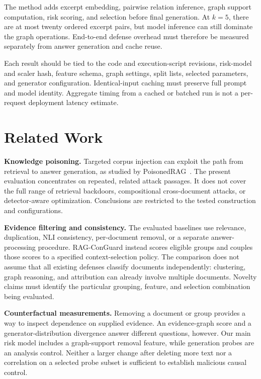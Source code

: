 \documentclass[sigconf]{acmart}
\newif\ifrevisionnotes
\newcommand{\verification}[1]{%
  \ifrevisionnotes
    \par\smallskip\noindent
    {\small\color{red!65!black}\textbf{Verification pending.} #1}\par\smallskip
  \fi}
\begin{document}
The method adds excerpt embedding, pairwise relation inference, graph support computation, risk scoring, and selection before final generation. At $k=5$, there are at most twenty ordered excerpt pairs, but model inference can still dominate the graph operations. End-to-end defense overhead must therefore be measured separately from answer generation and cache reuse.

Each result should be tied to the code and execution-script revisions, risk-model and scaler hash, feature schema, graph settings, split lists, selected parameters, and generator configuration. Identical-input caching must preserve full prompt and model identity. Aggregate timing from a cached or batched run is not a per-request deployment latency estimate.

\verification{The reported 0.67 seconds per generation is a batch-derived hot-run average, not measured end-to-end defense overhead. Confirm included operations, cache accounting, output-token counts, and component timings before adding an efficiency claim. Reconcile production revision 6685de0 with the later execution/report commit 3832f57 using the actual script hashes.}

\section{Related Work}

\textbf{Knowledge poisoning.} Targeted corpus injection can exploit the path from retrieval to answer generation, as studied by PoisonedRAG~\cite{zou2024poisonedrag}. The present evaluation concentrates on repeated, related attack passages. It does not cover the full range of retrieval backdoors, compositional cross-document attacks, or detector-aware optimization. Conclusions are restricted to the tested construction and configurations.

\textbf{Evidence filtering and consistency.} The evaluated baselines use relevance, duplication, NLI consistency, per-document removal, or a separate answer-processing procedure. RAG-ConGuard instead scores eligible groups and couples those scores to a specified context-selection policy. The comparison does not assume that all existing defenses classify documents independently: clustering, graph reasoning, and attribution can already involve multiple documents. Novelty claims must identify the particular grouping, feature, and selection combination being evaluated.

\textbf{Counterfactual measurements.} Removing a document or group provides a way to inspect dependence on supplied evidence. An evidence-graph score and a generator-distribution divergence answer different questions, however. Our main risk model includes a graph-support removal feature, while generation probes are an analysis control. Neither a larger change after deleting more text nor a correlation on a selected probe subset is sufficient to establish malicious causal control.
\end{document}
